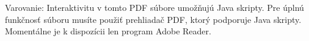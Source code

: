 Varovanie: Interaktivitu v tomto PDF s\' ubore umo\v z\v nuj\'u Java skripty. 
Pre \'upln\'u funk\v cnos\v t s\'uboru mus\'ite pou\v zi\v t prehliada\v c
PDF, ktor\' y podporuje Java skripty.  Moment\' alne je k dispoz\' icii len
program Adobe Reader.